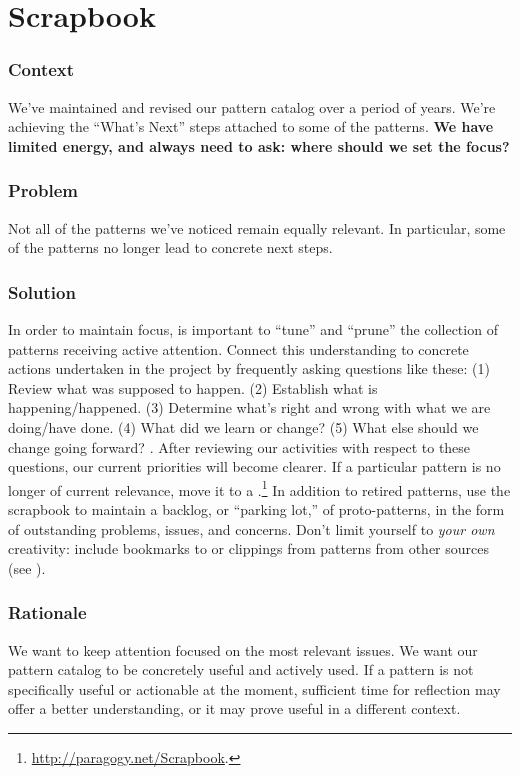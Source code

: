 \section{Scrapbook} \label{sec:Scrapbook}

\subsubsection*{Context} We've maintained and revised our pattern catalog over a period of years.  We're achieving
the ``What's Next'' steps attached to some of the patterns.
\textbf{We have limited energy, and always need to ask: where should we set the focus?}

\subsubsection*{Problem} Not all of the patterns we've noticed remain equally relevant.  In particular, some of the patterns no longer lead to concrete next steps.

\subsubsection*{Solution} In order to maintain focus, is important to ``tune'' and ``prune'' the collection of patterns receiving active attention.  Connect this understanding to concrete actions undertaken in the project by frequently asking questions like these:
(1) Review what was supposed to happen.
(2) Establish what is happening/happened.
(3) Determine what’s right and wrong with what we are doing/have done.
(4) What did we learn or change? 
(5) What else should we change going forward?  \cite[Chapter 28]{peeragogy-handbook}.
%
After reviewing our activities with respect to these questions, our
current priorities will become clearer.  If a particular pattern is no
longer of current relevance, move it to a
.\footnote{\url{http://paragogy.net/Scrapbook}.}  
%
In addition to retired patterns, use the scrapbook to maintain a
backlog, or ``parking lot,'' of proto-patterns, in the form of
outstanding problems, issues, and concerns.  Don't limit yourself to
\emph{your own} creativity: include bookmarks to or clippings from
patterns from other sources (see ).

\subsubsection*{Rationale} We want to keep attention focused on the most relevant issues.
We want our pattern catalog to be concretely useful and actively used.
If a pattern is not specifically useful or actionable at the
moment, sufficient time for reflection may offer a better
understanding, or it may prove useful in a different context.

